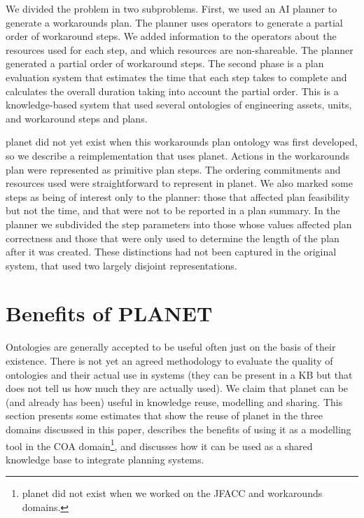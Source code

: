 We divided the problem in two subproblems.  
First, we used an AI planner to generate a 
workarounds plan.
The planner uses operators to generate a partial order of 
workaround steps.  We added information to the operators about the
resources used for each step, and which resources are non-shareable.  
The planner generated a partial order of workaround steps.
The second phase is a plan evaluation system that estimates the 
time that each step takes to complete and calculates the overall 
duration taking into account the partial order.  
This is a knowledge-based system that used several ontologies of 
engineering assets, units, and workaround steps and plans.  

{\sc planet} did not yet exist when this workarounds plan ontology 
was first developed,
so we describe a reimplementation that uses {\sc planet}.
Actions in the workarounds plan were represented as primitive plan
steps. The ordering commitments and resources used were straightforward
to represent in {\sc planet}. We also marked some steps as being of
interest only to the planner: those that affected plan feasibility but
not the time, and that were not to be reported in a plan summary. In
the planner we subdivided the step parameters into those whose values
affected plan correctness and those that were only used to determine the 
length of the plan after it was created. These distinctions had not
been captured in the original system, that used two largely disjoint
representations. 



\section{Benefits of PLANET}

Ontologies are generally accepted to be useful 
often just on the basis of their existence.  
There is not yet an agreed methodology to 
evaluate the quality of ontologies and their 
actual use in systems (they can be present in a KB 
but that does not tell us how much they are actually used). 
We claim that {\sc planet} can be (and already has been) useful in
knowledge reuse, modelling and sharing.
This section presents some estimates that show the reuse of 
{\sc planet} in the three domains discussed in this paper, 
describes the benefits of using it as a modelling tool
in the COA 
domain\footnote{{\sc planet} did not exist when we worked 
on the JFACC and workarounds domains.},
and discusses how it can be used as a shared knowledge base
to integrate planning systems.

